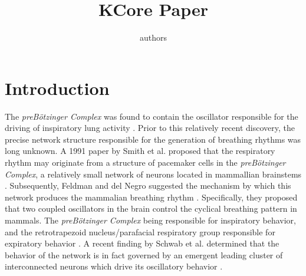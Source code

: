 \documentclass[11pt,letterpaper]{article}
\title{KCore Paper}
\begin{document}

\author{authors}
\maketitle

\section{Introduction}

The \textit{preB{\"o}tzinger Complex} was found to contain the oscillator responsible for the driving of inspiratory lung activity \cite{feldman_del_negro}. Prior to this relatively recent discovery, the precise network structure responsible for the generation of breathing rhythms was long unknown. A 1991 paper by Smith et al. proposed that the respiratory rhythm may originate from a structure of pacemaker cells in the \textit{preB{\"o}tzinger Complex}, a relatively small network of neurons located in mammallian brainstems \cite{preBotzinger_paper}. Subsequently, Feldman and del Negro suggested the mechanism by which this network produces the mammalian breathing rhythm \cite{feldman_del_negro}. Specifically, they proposed that two coupled oscillators in the brain control the cyclical breathing pattern in mammals. The \textit{preB{\"o}tzinger Complex} being responsible for inspiratory behavior, and the retrotrapezoid nucleus/parafacial respiratory group responsible for expiratory behavior \cite{feldman_del_negro}. A recent finding by Schwab et al. determined that the behavior of the network is in fact governed by an emergent leading cluster of interconnected neurons which drive its oscillatory behavior \cite{kcore_paper}.\\
\end{document}
